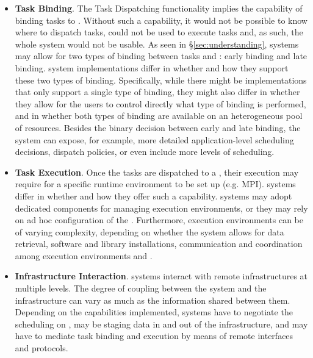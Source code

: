\documentclass{sig-alternate}
\begin{document}
\begin{itemize}
\item \textbf{Task Binding}. The Task Dispatching functionality implies the
  capability of binding tasks to \pilots. Without such a capability, it would
  not be possible to know where to dispatch tasks, \pilots could not be used to
  execute tasks and, as such, the whole \pilot system would not be usable. As
  seen in \S\ref{sec:understanding}, \pilot systems may allow for two types of
  binding between tasks and \pilots: early binding and late binding. \pilot
  system implementations differ in whether and how they support these two types
  of binding. Specifically, while there might be implementations that only
  support a single type of binding, they might also differ in whether they
  allow for the users to control directly what type of binding is performed,
  and in whether both types of binding are available on an heterogeneous pool
  of resources. Besides the binary decision between early and late binding, the
  \pilot system can expose, for example, more detailed application-level
  scheduling decisions, dispatch policies, or even include more levels of
  scheduling.

\item \textbf{Task Execution}. Once the tasks are dispatched to a \pilot, their
  execution may require for a specific runtime environment to be set up (e.g.
  MPI). \pilot systems differ in whether and how they offer such a capability.
  \pilot systems may adopt dedicated components for managing execution
  environments, or they may rely on ad hoc configuration of the \pilots.
  Furthermore, execution environments can be of varying complexity, depending on
  whether the \pilot system allows for data retrieval, software and library
  installations, communication and coordination among execution environments and
  \pilots.


\item \textbf{Infrastructure Interaction}. \pilot systems interact with remote
  infrastructures at multiple levels. The degree of coupling between the \pilot
  system and the infrastructure can vary as much as the information shared
  between them. Depending on the capabilities implemented, \pilot systems have
  to negotiate the scheduling on \pilots, may be staging data in and out of the
  infrastructure, and may have to mediate task binding and execution by means
  of remote interfaces and protocols.

   

\end{itemize}
\end{document}
